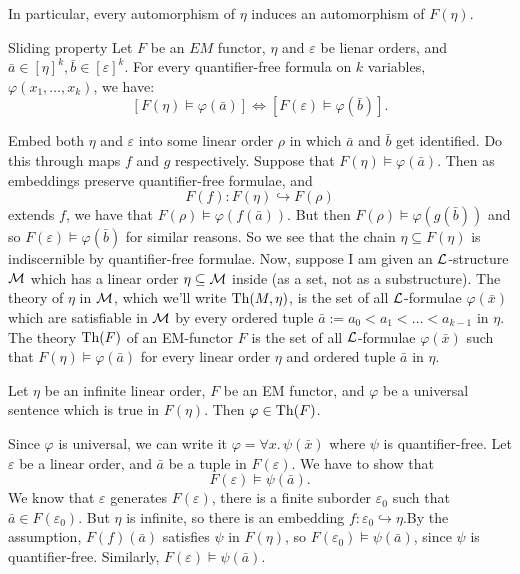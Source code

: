 \documentclass{article}
\numberwithin{thm}{subsection}
\begin{document}
In particular, every automorphism of $\eta$ induces an automorphism of $F(\eta)$.
\begin{fancyprop}{Sliding property}
    Let $F$ be an $EM$ functor, $\eta$ and $\varepsilon$ be lienar orders, and $\bar a \in [\eta]^{k}, \bar b \in [\varepsilon]^{k}$. For every quantifier-free formula on $k$ variables, $\varphi(x_{1}, \dots, x_{k})$, we have: \[ \left[ F(\eta) \models \varphi (\bar a)\right] \Leftrightarrow \left[ F(\varepsilon) \models \varphi(\bar b) \right]. \]
\end{fancyprop}
\proof Embed both $\eta$ and $\varepsilon$ into some linear order $\rho$ in which $\bar a$ and $\bar b$ get identified. Do this through maps $f$ and $g$ respectively. Suppose that $F(\eta) \models \varphi(\bar a)$. Then as embeddings preserve quantifier-free formulae, and \[ F(f): F(\eta) \hookrightarrow F(\rho) \] extends $f$, we have that $F(\rho) \models \varphi(f(\bar a))$. \gap But then $F(\rho) \models \varphi(g(\bar b))$ and so $F(\varepsilon) \models \varphi(\bar b)$ for similar reasons. \endproof So we see that the chain $\eta \subseteq F(\eta)$ is indiscernible by quantifier-free formulae. \gap Now, suppose I am given an $\mathcal{L}$-structure $\mathcal{M}$ which has a linear order $\eta \subseteq \mathcal{M}$ inside (as a set, not as a substructure). The theory of $\eta$ in $\mathcal{M}$, which we'll write $\operatorname{Th}(M,\eta)$, is the set of all $\mathcal{L}$-formulae $\varphi(\bar x)$ which are satisfiable in $\mathcal{M}$ by every ordered tuple $\bar a := a_{0} < a_{1} < \dots < a_{k-1}$ in $\eta$. The theory $\operatorname{Th}(F)$ of an EM-functor $F$ is the set of all $\mathcal{L}$-formulae $\varphi(\bar x)$ such that $F(\eta) \models \varphi(\bar a)$ for every linear order $\eta$ and ordered tuple $\bar a$ in $\eta$.
\begin{fancylem}{}
    Let $\eta$ be an infinite linear order, $F$ be an EM functor, and $\varphi$ be a universal sentence which is true in $F(\eta)$. Then $\varphi \in \operatorname{Th}(F)$.
\end{fancylem}
\proof Since $\varphi$ is universal, we can write it $\varphi = \forall x. \, \psi(\bar x)$ where $\psi$ is quantifier-free. Let $\varepsilon$ be a linear order, and $\bar a$ be a tuple in $F(\varepsilon)$. We have to show that \[ F(\varepsilon) \models \psi(\bar a).\]
We know that $\varepsilon$ generates $F(\varepsilon)$, there is a finite suborder $\varepsilon_{0}$ such that $\bar a \in F(\varepsilon_{0})$. But $\eta$ is infinite, so there is an embedding $f: \varepsilon_{0} \hookrightarrow \eta$.\gap By the assumption, $F(f)(\bar a)$ satisfies $\psi$ in $F(\eta)$, so $F(\varepsilon_{0}) \models \psi(\bar a)$, since $\psi$ is quantifier-free. Similarly, $F(\varepsilon) \models \psi(\bar a)$. \endproof
\end{document}
